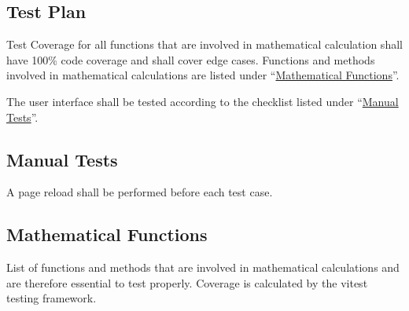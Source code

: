 \subsection{Test Plan}
Test Coverage for all functions that are involved in mathematical calculation shall have 100\% code coverage and shall cover edge cases. Functions and methods involved in mathematical calculations are listed under \enquote{\hyperref[tab:math_functions]{Mathematical Functions}}.

The user interface shall be tested according to the checklist listed under \enquote{\hyperref[tab:manual_tests]{Manual Tests}}. 

\subsection{Manual Tests}
A page reload shall be performed before each test case.


\newpage
\subsection{Mathematical Functions}

List of functions and methods that are involved in mathematical calculations and are therefore essential to test properly. Coverage is calculated by the {\ttfamily vitest} testing framework.

    
%